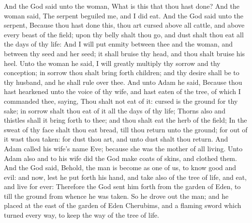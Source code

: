 \begin{biblechapter}
\verse And the \LORD God said unto the woman, What is this that thou hast done? And the woman said, The serpent beguiled me, and I did eat.
\verse And the \LORD God said unto the serpent, Because thou hast done this, thou art cursed above all cattle, and above every beast of the field; upon thy belly shalt thou go, and dust shalt thou eat all the days of thy life:
\verse And I will put enmity between thee and the woman, and between thy seed and her seed; it shall bruise thy head, and thou shalt bruise his heel.
\verse Unto the woman he said, I will greatly multiply thy sorrow and thy conception; in sorrow thou shalt bring forth children; and thy desire shall be to thy husband, and he shall rule over thee.
\verse And unto Adam he said, Because thou hast hearkened unto the voice of thy wife, and hast eaten of the tree, of which I commanded thee, saying, Thou shalt not eat of it: cursed is the ground for thy sake; in sorrow shalt thou eat of it all the days of thy life;
\verse Thorns also and thistles shall it bring forth to thee; and thou shalt eat the herb of the field;
\verse In the sweat of thy face shalt thou eat bread, till thou return unto the ground; for out of it wast thou taken: for dust thou art, and unto dust shalt thou return.
\verse And Adam called his wife's name Eve; because she was the mother of all living.
\verse Unto Adam also and to his wife did the \LORD God make coats of skins, and clothed them.
\verse And the \LORD God said, Behold, the man is become as one of us, to know good and evil: and now, lest he put forth his hand, and take also of the tree of life, and eat, and live for ever:
\verse Therefore the \LORD God sent him forth from the garden of Eden, to till the ground from whence he was taken.
\verse So he drove out the man; and he placed at the east of the garden of Eden Cherubims, and a flaming sword which turned every way, to keep the way of the tree of life.
\end{biblechapter}


